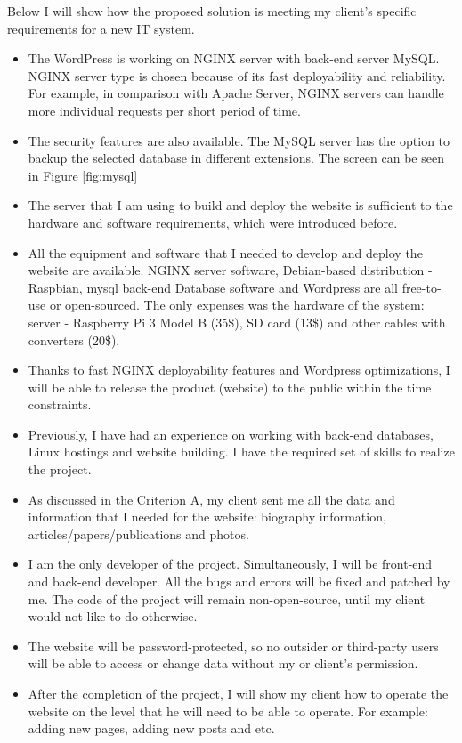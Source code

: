 \documentclass[a4paper, 12pt]{article}
\begin{document}
Below I will show how the proposed solution is meeting my client's specific requirements for a new IT system.

\begin{itemize}
  
\item The WordPress is working on NGINX server with back-end server MySQL. NGINX server type is chosen because of its fast deployability and reliability. For example, in comparison with Apache Server, NGINX servers can handle more individual requests per short period of time.

\item The security features are also available. The MySQL server has the option to backup the selected database in different extensions. The screen can be seen in Figure \ref{fig:mysql}

\item The server that I am using to build and deploy the website is sufficient to the hardware and software requirements, which were introduced before.

\item All the equipment and software that I needed to develop and deploy the website are available. NGINX server software, Debian-based distribution - Raspbian, mysql back-end Database software and Wordpress are all free-to-use or open-sourced. The only expenses was the hardware of the system: server - Raspberry Pi 3 Model B (35\$), SD card (13\$) and other cables with converters (20\$).

\item Thanks to fast NGINX deployability features and Wordpress optimizations, I will be able to release the product (website) to the public within the time constraints.

\item Previously, I have had an experience on working with back-end databases, Linux hostings and website building. I have the required set of skills to realize the project.

\item As discussed in the Criterion A, my client sent me all the data and information that I needed for the website: biography information, articles/papers/publications and photos.

\item I am the only developer of the project. Simultaneously, I will be front-end and back-end developer. All the bugs and errors will be fixed and patched by me. The code of the project will remain non-open-source, until my client would not like to do otherwise.

\item The website will be password-protected, so no outsider or third-party users will be able to access or change data without my or client's permission.

\item After the completion of the project, I will show my client how to operate the website on the level that he will need to be able to operate. For example: adding new pages, adding new posts and etc.

\end{itemize}
\end{document}
